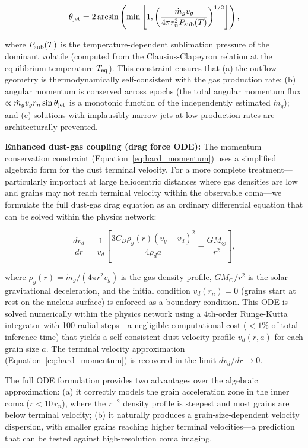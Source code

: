 \documentclass[usenatbib]{mnras}
\begin{document}
\begin{equation}\label{eq:hard_angular}
\theta_{\rm jet} = 2 \arcsin\left(\min\left[1, \left(\frac{\dot{m}_g v_g}{4 \pi r_n^2 P_{\rm sub}(T)}\right)^{1/2}\right]\right),
\end{equation}

where $P_{\rm sub}(T)$ is the temperature-dependent sublimation pressure of the dominant volatile (computed from the Clausius-Clapeyron relation at the equilibrium temperature $T_{\rm eq}$). This constraint ensures that (a) the outflow geometry is thermodynamically self-consistent with the gas production rate; (b) angular momentum is conserved across epochs (the total angular momentum flux $\propto \dot{m}_g v_g r_n \sin\theta_{\rm jet}$ is a monotonic function of the independently estimated $\dot{m}_g$); and (c) solutions with implausibly narrow jets at low production rates are architecturally prevented.

\textbf{Enhanced dust-gas coupling (drag force ODE):} The momentum conservation constraint (Equation~\ref{eq:hard_momentum}) uses a simplified algebraic form for the dust terminal velocity. For a more complete treatment---particularly important at large heliocentric distances where gas densities are low and grains may not reach terminal velocity within the observable coma---we formulate the full dust-gas drag equation as an ordinary differential equation that can be solved within the physics network:

\begin{equation}\label{eq:dust_gas_ode}
\frac{d v_d}{d r} = \frac{1}{v_d}\left[\frac{3 C_D \rho_g(r) (v_g - v_d)^2}{4 \rho_d a} - \frac{G M_{\odot}}{r^2}\right],
\end{equation}

where $\rho_g(r) = \dot{m}_g / (4\pi r^2 v_g)$ is the gas density profile, $G M_{\odot}/r^2$ is the solar gravitational deceleration, and the initial condition $v_d(r_n) = 0$ (grains start at rest on the nucleus surface) is enforced as a boundary condition. This ODE is solved numerically within the physics network using a 4th-order Runge-Kutta integrator with 100 radial steps---a negligible computational cost ($<1$\% of total inference time) that yields a self-consistent dust velocity profile $v_d(r, a)$ for each grain size $a$. The terminal velocity approximation (Equation~\ref{eq:hard_momentum}) is recovered in the limit $d v_d / d r \rightarrow 0$.

The full ODE formulation provides two advantages over the algebraic approximation: (a) it correctly models the grain acceleration zone in the inner coma ($r < 10\,r_n$), where the $r^{-2}$ density profile is steepest and most grains are below terminal velocity; (b) it naturally produces a grain-size-dependent velocity dispersion, with smaller grains reaching higher terminal velocities---a prediction that can be tested against high-resolution coma imaging.
\end{document}
